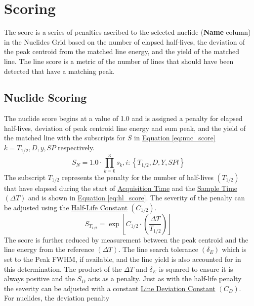 \documentclass[12pt,report,justified]{SANDreport}
\begin{document}
\section{Scoring}\label{sec:score}
The score is a series of penalties ascribed to the selected nuclide (\textbf{Name} column) in the Nuclides
Grid based on the number of elapsed half-lives, the deviation of the peak centroid from the matched
line energy, and the yield of the matched line. The line score is a metric of the number of lines
that should have been detected that have a matching peak.

        \subsection{Nuclide Scoring}\label{sec:nuc_score}
The nuclide score begins at a value of 1.0 and is assigned a penalty for elapsed half-lives, deviation
of peak centroid line energy and sum peak, and the yield of the matched line with the subscripts
for \(S\) in \hyperref[eq:nuc_score]{Equation \ref{eq:nuc_score}} \(k = T_{1/2},D, y, SP\) respectively.
\begin{equation}
    S_N = 1.0 \cdot \prod_{k=0}^{3} s_k, i: \left\{T_{1/2},D,Y,SPl\right\}
   \label{eq:nuc_score}
\end{equation}
The subscript \(T_{1/2}\) represents the penalty for the number of half-lives \(\left(T_{1/2}\right)\) that have elapsed
during the start of \hyperref[itm:time_acq]{Acquisition Time} and the \hyperref[itm:time_smp]{Sample Time}
\(\left( \Delta T\right)\) and is shown in \hyperref[eq:hl_score]{Equation \ref{eq:hl_score}}. The severity of the
penalty can be adjusted using the \hyperref[itm:hl_const]{Half-Life Constant} \(\left(C_{1/2}\right) \).
\begin{equation}
S_{T_{1/2}} = \exp{\left[ C_{1/2} \cdot \left( \frac{\Delta T}{T_{1/2}} \right) \right]}
\label{eq:hl_score}
\end{equation}
The score is further reduced by measurement between the peak centroid and the line energy from
the reference \(\left( \Delta T\right)\). The line search tolerance  \(\left( \delta _E\right)\) which is set to
the Peak FWHM, if available, and the line yield is also accounted for in this determination. The
product of the  \(\Delta T\) and \( \delta _E\) is squared to ensure it is always positive and the \(S_D\)
acts as a penalty. Just as with the half-life penalty the severity can be adjusted with a constant
\hyperref[itm:ln_dev_const]{Line Deviation Constant} \(\left(C_D \right)\). For nuclides, the deviation penalty
\end{document}
